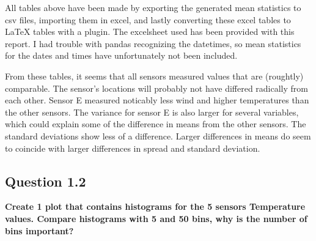 \documentclass{report}
\begin{document}
	All tables above have been made by exporting the generated mean statistics to csv files, importing them in excel, and lastly converting these excel tables to LaTeX tables with a plugin. The excelsheet used has been provided with this report. I had trouble with pandas recognizing the datetimes, so mean statistics for the dates and times have unfortunately not been included.
	
	From these tables, it seems that all sensors measured values that are (roughtly) comparable. The sensor's locations will probably not have differed radically from each other. Sensor E measured noticably less wind and higher temperatures than the other sensors. The variance for sensor E is also larger for several variables, which could explain some of the difference in means from the other sensors. The standard deviations show less of a difference. Larger differences in means do seem to coincide with larger differences in spread and standard deviation.
	
	
	\subsection{Question 1.2}
	\textbf{Create 1 plot that contains histograms for the 5 sensors Temperature values. Compare histograms with 5 and 50 bins, why is the number of bins important?}
\end{document}
